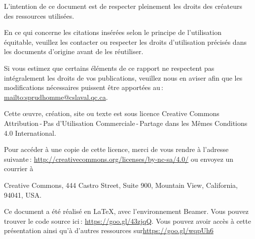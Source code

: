\framebreak
\par L’intention de ce document est de respecter pleinement les droits des créateurs des ressources
utilisées.
	\par En ce qui concerne les citations insérées selon le principe de l'utilisation équitable, veuillez les contacter ou respecter les droits d’utilisation précisés dans les documents d’origine avant de les réutiliser.
	\par Si vous estimez que certains éléments de ce rapport ne respectent pas intégralement les droits de vos
publications, veuillez nous en aviser afin que les modifications nécessaires puissent être apportées au\,: \url{mailto:sprudhomme@cslaval.qc.ca}.
	\par Cette \oe uvre, création, site ou texte est sous licence Creative Commons Attribution\,-\,Pas d’Utilisation Commerciale\,-\,Partage dans les Mêmes Conditions 4.0 International. \\
	\par 
	 Pour accéder à une copie de cette licence, merci de vous rendre à l'adresse suivante\,: \url{http://creativecommons.org/licenses/by-nc-sa/4.0/} ou envoyez un courrier à 

\par Creative Commons, 444 Castro Street, Suite 900, Mountain View, California, 94041, USA.
\par Ce document a été réalisé en \LaTeX, avec l'environnement Beamer. Vous pouvez trouver le code source ici\,: \url{https://goo.gl/43zjqQ}. Vous pouvez avoir accès à cette présentation ainsi qu'à d'autres ressources sur\url {https://goo.gl/wqpUh6}


